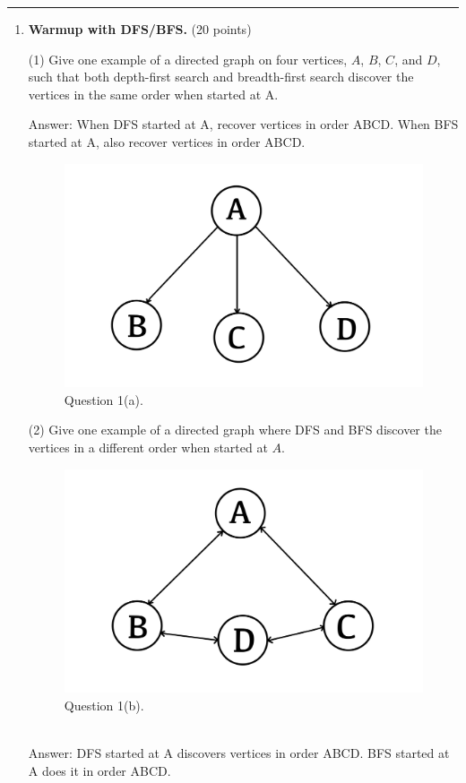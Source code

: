 \documentclass[12pt]{article}
\begin{document}
\rule{\linewidth}{0.4pt}


\begin{enumerate}
  \item \textbf{Warmup with DFS/BFS.} (20 points)

(1) Give one example of a directed graph on four vertices, $A$, $B$, $C$, and $D$, such that both depth-first search and breadth-first search discover the vertices in the same order when started at A.  
\\{\color{blue}Answer: When DFS started at A, recover vertices in order ABCD. When BFS started at A, also recover vertices in order ABCD.
   \begin{figure}[h]
  	\centering
  	\includegraphics*[scale=0.1]{HW3-1.jpg}
	\caption{Question 1(a).}
	\label{fig:example}
  \end{figure}}

(2) Give one example of a directed graph where DFS and BFS discover the vertices in a different order when started at $A$.
{ \begin{figure}[h]
  	\centering
  	\includegraphics*[scale=0.1]{HW3-2.jpg}
	\caption{Question 1(b).}
	\label{fig:example}
  \end{figure}}
  \\{\color{blue}Answer: DFS started at A discovers vertices in order ABCD. BFS started at A does it in order ABCD.
  }


\end{enumerate}
\end{document}
